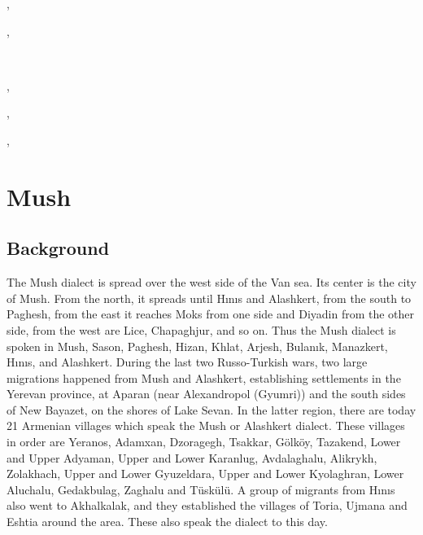 ,

,


~ 


,

,

,






\chapter{Mush}\label{chapter:Mush}
\section{Background}

\begin{adjarianpage}\label{page:116}\end{adjarianpage}%

The Mush dialect is spread over the west side of the Van sea. Its center is the city of Mush. From the north, it spreads until Hınıs and Alashkert, from the south to Paghesh, from the east it reaches Moks from one side and Diyadin from the other side, from the west are Lice, Chapaghjur, and so on. Thus the Mush dialect is spoken in Mush, Sason, Paghesh, Hizan, Khlat, Arjesh, Bulanık, Manazkert, Hınıs, and Alashkert. During the last two Russo-Turkish wars, two large migrations happened from Mush and Alashkert, establishing settlements in the Yerevan province, at Aparan (near Alexandropol (Gyumri)) and the south sides of New Bayazet, on the shores of Lake Sevan. In the latter region, there are today 21 Armenian villages which speak the Mush or Alashkert dialect. These villages in order are Yeranos, Adamxan, Dzoragegh, Tsakkar, Gölköy, Tazakend, Lower and Upper Adyaman, Upper and Lower Karanlug, Avdalaghalu, Alikrykh, Zolakhach, Upper and Lower Gyuzeldara, Upper and Lower Kyolaghran, Lower Aluchalu, Gedakbulag, Zaghalu and Tüskülü. A group of migrants from Hınıs also went to Akhalkalak, and they established the villages of Toria, Ujmana and Eshtia around the area. These also speak the dialect to this day.

